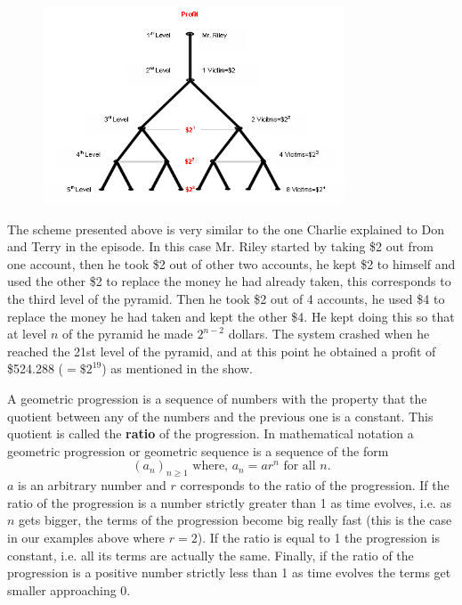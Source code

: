 	\begin{figure}[H]
	\centering
	\includegraphics[width=0.80\textwidth]{../sections/seasons/season1/108/images/pyramid.png} 
	\end{figure}


\begin{ex}
The scheme presented above is very similar to the one Charlie explained to Don and Terry in the episode. In this case Mr. Riley started by taking \$2 out from one account, then he took \$2 out of other two accounts, he kept \$2 to himself and used the other \$2 to replace the money he had already taken, this corresponds to the third level of the pyramid. Then he took \$2 out of 4 accounts, he used \$4 to replace the money he had taken and kept the other \$4. He kept doing this so that at level $n$ of the pyramid he made $2^{n-2}$ dollars. The system crashed when he reached the 21st level of the pyramid, and at this point he obtained a profit of \$524.288 ($= \$2^{19}$) as mentioned in the show.
\end{ex}




A geometric progression is a sequence of numbers with the property that the quotient between any of the numbers and the previous one is a constant. This quotient is called the \textbf{ratio} of the progression. In mathematical notation a geometric progression or geometric sequence is a sequence of the form
	\[
	(a_n)_{n \geq 1} \text{ where, }a_n = ar^n \text{ for all } n.
	\]
$a$ is an arbitrary number and $r$ corresponds to the ratio of the progression. If the ratio of the progression is a number strictly greater than 1 as time evolves, i.e. as $n$ gets bigger, the terms of the progression become big really fast (this is the case in our examples above where $r=2$). If the ratio is equal to 1 the progression is constant, i.e. all its terms are actually the same. Finally, if the ratio of the progression is a positive number strictly less than 1 as time evolves the terms get smaller approaching 0. 


